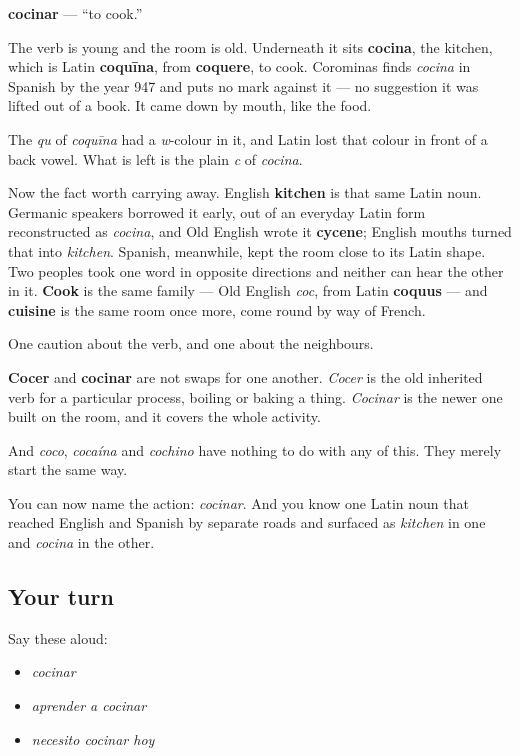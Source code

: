 \begin{cousinweb}
\textbf{cocinar} — \textquotedblleft{}to cook.\textquotedblright{}

The verb is young and the room is old. Underneath it sits \textbf{cocina}, the kitchen, which is Latin \textbf{coquīna}, from \textbf{coquere}, to cook. Corominas finds \emph{cocina} in Spanish by the year 947 and puts no mark against it — no suggestion it was lifted out of a book. It came down by mouth, like the food.

The \emph{qu} of \emph{coquīna} had a \emph{w}-colour in it, and Latin lost that colour in front of a back vowel. What is left is the plain \emph{c} of \emph{cocina}.

Now the fact worth carrying away. English \textbf{kitchen} is that same Latin noun. Germanic speakers borrowed it early, out of an everyday Latin form reconstructed as \emph{cocina}, and Old English wrote it \textbf{cycene}; English mouths turned that into \emph{kitchen}. Spanish, meanwhile, kept the room close to its Latin shape. Two peoples took one word in opposite directions and neither can hear the other in it. \textbf{Cook} is the same family — Old English \emph{coc}, from Latin \textbf{coquus} — and \textbf{cuisine} is the same room once more, come round by way of French.

One caution about the verb, and one about the neighbours.

\textbf{Cocer} and \textbf{cocinar} are not swaps for one another. \emph{Cocer} is the old inherited verb for a particular process, boiling or baking a thing. \emph{Cocinar} is the newer one built on the room, and it covers the whole activity.

And \emph{coco}, \emph{cocaína} and \emph{cochino} have nothing to do with any of this. They merely start the same way.
\end{cousinweb}

\begin{grammarlens}[title={What you've built}]
You can now name the action: \emph{cocinar}. And you know one Latin noun that reached English and Spanish by separate roads and surfaced as \emph{kitchen} in one and \emph{cocina} in the other.
\end{grammarlens}

\subsection*{Your turn}
Say these aloud:

\begin{itemize}
\raggedright
  \item \emph{cocinar}
  \item \emph{aprender a cocinar}
  \item \emph{necesito cocinar hoy}
\end{itemize}

